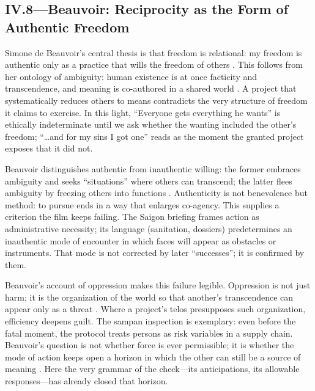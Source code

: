 \subsection*{IV.8—Beauvoir: Reciprocity as the Form of Authentic Freedom}
\label{ssec:iii-beauvoir}
Simone de Beauvoir's central thesis is that freedom is relational: my freedom is authentic only as a
practice that wills the freedom of others \parencite[p.~73]{Beauvoir1976}. This follows from
her ontology of ambiguity: human existence is at once facticity and transcendence, and meaning
is co-authored in a shared world \parencite[pp.~9--14, 24--30]{Beauvoir1976}. A project that
systematically reduces others to means contradicts the very structure of freedom it claims to
exercise. In this light, ``Everyone gets everything he wants'' is ethically indeterminate until
we ask whether the wanting included the other's freedom; ``\ldots and for my sins I got one''
reads as the moment the granted project exposes that it did not.

Beauvoir distinguishes authentic from inauthentic willing: the former embraces ambiguity and
seeks ``situations'' where others can transcend; the latter flees ambiguity by freezing others
into functions \parencite[pp.~70--76, 134--145]{Beauvoir1976}. Authenticity is not benevolence
but method: to pursue ends in a way that enlarges co-agency. This supplies a criterion the film
keeps failing. The Saigon briefing frames action as administrative necessity; its language
(sanitation, dossiers) predetermines an inauthentic mode of encounter in which faces will appear
as obstacles or instruments. That mode is not corrected by later ``successes''; it is confirmed
by them.

Beauvoir's account of oppression makes this failure legible. Oppression is not just harm; it is
the organization of the world so that another's transcendence can appear only as a threat
\parencite[pp.~85--91, 157--161]{Beauvoir1976}. Where a project's telos presupposes such
organization, efficiency deepens guilt. The sampan inspection is exemplary: even before the
fatal moment, the protocol treats persons as risk variables in a supply chain. Beauvoir's
question is not whether force is ever permissible; it is whether the mode of action keeps open
a horizon in which the other can still be a source of meaning
\parencite[pp.~139--147, 164--173]{Beauvoir1976}. Here the very grammar of the check—its
anticipations, its allowable responses—has already closed that horizon.

